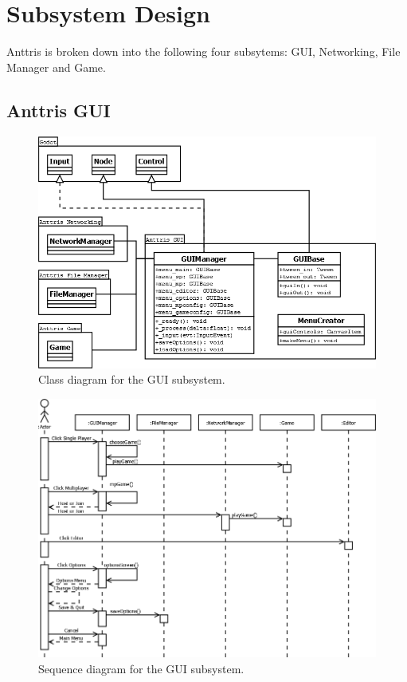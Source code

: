\documentclass[12pt]{article}
\begin{document}
\section{Subsystem Design} %
Anttris is broken down into the following four subsytems: GUI, Networking, File Manager and Game.
\subsection{Anttris GUI} %
    \begin{figure}[H]
        \centering
        \includegraphics[width=6in]{Anttris_GUIClass.png}
        \caption{Class diagram for the GUI subsystem.}
    \end{figure}
    \begin{figure}[H]
        \centering
        \includegraphics[width=6in]{Anttris_GUISequence.png}
        \caption{Sequence diagram for the GUI subsystem.}
    \end{figure}
\end{document}
